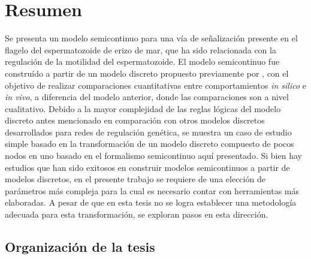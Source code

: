 \begingroup
\let\clearpage\relax
\let\cleardoublepage\relax
\let\cleardoublepage\relax

\chapter*{Resumen}

Se presenta un modelo semicontinuo para una vía de señalización presente en el flagelo del espermatozoide de erizo de mar, que ha sido relacionada con la regulación de la motilidad del espermatozoide. El modelo semicontinuo fue construído a partir de un modelo discreto propuesto previamente por \citeauthor{Espinal2011} \citep{Espinal2011}, con el objetivo de realizar comparaciones cuantitativas entre comportamientos \emph{in silico} e \emph{in vivo}, a diferencia del modelo anterior, donde las comparaciones son a nivel cualitativo. Debido a la mayor complejidad de las reglas lógicas del modelo discreto antes mencionado en comparación con otros modelos discretos desarrollados para redes de regulación genética, se muestra un caso de estudio simple basado en la transformación de un modelo discreto compuesto de pocos nodos en uno basado en el formalismo semicontinuo aquí presentado. Si bien hay estudios que han sido exitosos en construir modelos semicontinuos a partir de modelos discretos, en el presente trabajo se requiere de una elección de parámetros más compleja para la cual es necesario contar con herramientas más elaboradas. A pesar de que en esta tesis no se logra establecer una metodología adecuada para esta transformación, se exploran pasos en esta dirección.

\section*{Organización de la tesis}


